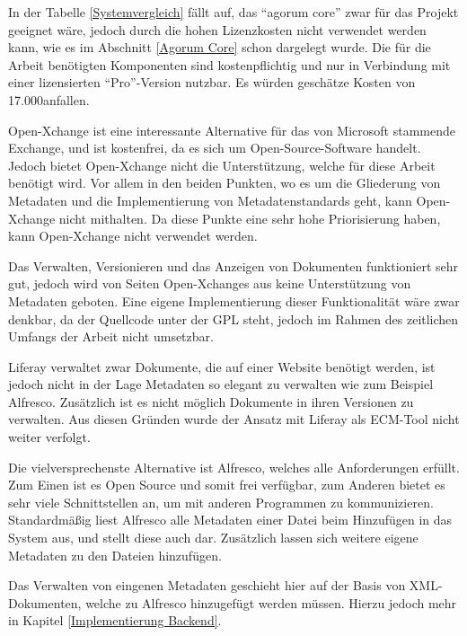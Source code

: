 In der Tabelle \ref{Systemvergleich} f\"allt auf, das "`agorum core"' zwar f\"ur das Projekt geeignet w\"are, jedoch durch die hohen Lizenzkosten nicht verwendet werden kann, wie es im Abschnitt \ref{Agorum Core} schon dargelegt wurde. Die f\"ur die Arbeit ben\"otigten Komponenten sind kostenpflichtig und nur in Verbindung mit einer lizensierten "`Pro"'-Version nutzbar. Es w\"urden gesch\"atze Kosten von 17.000\EUR  anfallen.

Open-Xchange ist eine interessante Alternative f\"ur das von Microsoft stammende Exchange, und ist kostenfrei, da es sich um Open-Source-Software handelt. Jedoch bietet Open-Xchange nicht die Unterst\"utzung, welche f\"ur diese Arbeit ben\"otigt wird. Vor allem in den beiden Punkten, wo es um die Gliederung von Metadaten und die Implementierung von Metadatenstandards geht, kann Open-Xchange nicht mithalten. Da diese Punkte eine sehr hohe Priorisierung haben, kann Open-Xchange nicht verwendet werden.

Das Verwalten, Versionieren und das Anzeigen von Dokumenten funktioniert sehr gut, jedoch wird von Seiten Open-Xchanges aus keine Unterst\"utzung von Metadaten geboten. Eine eigene Implementierung dieser Funktionalit\"at w\"are zwar denkbar, da der Quellcode unter der \ac{GPL} steht, jedoch im Rahmen des zeitlichen Umfangs der Arbeit nicht umsetzbar.

Liferay verwaltet zwar Dokumente, die auf einer Website ben\"otigt werden, ist jedoch nicht in der Lage Metadaten so elegant zu verwalten wie zum Beispiel Alfresco. Zus\"atzlich ist es nicht m\"oglich Dokumente in ihren Versionen zu verwalten. Aus diesen Gr\"unden wurde der Ansatz mit Liferay als ECM-Tool nicht weiter verfolgt.

Die vielversprechenste Alternative ist Alfresco, welches alle Anforderungen erf\"ullt. Zum Einen ist es Open Source und somit frei verf\"ugbar, zum Anderen bietet es sehr viele Schnittstellen an, um mit anderen Programmen zu kommunizieren. Standardm\"a\ss{}ig liest Alfresco alle Metadaten einer Datei beim Hinzuf\"ugen in das System aus, und stellt diese auch dar. Zus\"atzlich lassen sich weitere eigene Metadaten zu den Dateien hinzuf\"ugen. 

Das Verwalten von eingenen Metadaten geschieht hier auf der Basis von XML-Dokumenten, welche zu Alfresco hinzugef\"ugt werden m\"ussen.
Hierzu jedoch mehr in Kapitel \ref{Implementierung Backend}.


